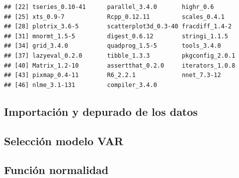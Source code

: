 \documentclass[12pt, twoside]{book}\usepackage[]{graphicx}\usepackage[]{color}
\makeatletter
\newenvironment{kframe}{%
 \def\at@end@of@kframe{}%
 \ifinner\ifhmode%
  \def\at@end@of@kframe{\end{minipage}}%
  \begin{minipage}{\columnwidth}%
 \fi\fi%
 \def\FrameCommand##1{\hskip\@totalleftmargin \hskip-\fboxsep
 \colorbox{shadecolor}{##1}\hskip-\fboxsep
     \hskip-\linewidth \hskip-\@totalleftmargin \hskip\columnwidth}%
 \MakeFramed {\advance\hsize-\width
   \@totalleftmargin\z@ \linewidth\hsize
   \@setminipage}}%
 {\par\unskip\endMakeFramed%
 \at@end@of@kframe}
\newenvironment{knitrout}{}{} %
\numberwithin{equation}{section}
\numberwithin{theorem}{section}
\numberwithin{teorema}{section}
\numberwithin{defi}{section}
\numberwithin{prop}{section}
\numberwithin{defi}{section}
\theoremstyle{plain}
\makeatother
\begin{document}
\begin{knitrout}
\begin{kframe}
\begin{verbatim}
## [22] tseries_0.10-41      parallel_3.4.0       highr_0.6           
## [25] xts_0.9-7            Rcpp_0.12.11         scales_0.4.1        
## [28] plotrix_3.6-5        scatterplot3d_0.3-40 fracdiff_1.4-2      
## [31] mnormt_1.5-5         digest_0.6.12        stringi_1.1.5       
## [34] grid_3.4.0           quadprog_1.5-5       tools_3.4.0         
## [37] lazyeval_0.2.0       tibble_1.3.3         pkgconfig_2.0.1     
## [40] Matrix_1.2-10        assertthat_0.2.0     iterators_1.0.8     
## [43] pixmap_0.4-11        R6_2.2.1             nnet_7.3-12         
## [46] nlme_3.1-131         compiler_3.4.0
\end{verbatim}
\end{kframe}
\end{knitrout}

\subsection{Importación y depurado de los datos}



\subsection{Selección modelo VAR}



\subsection{Función normalidad}



\endgroup
\end{document}
